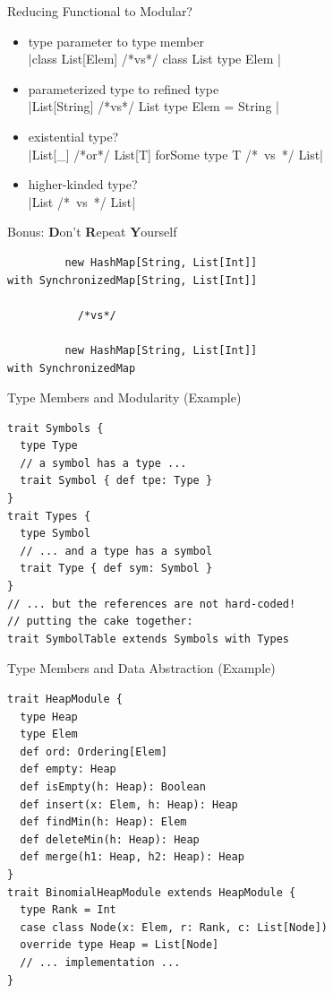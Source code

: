 \documentclass{beamer}
\begin{document}
\begin{frame}[fragile]{Reducing Functional to Modular?}
\begin{itemize}
\item type parameter to type member\\
|class List[Elem] {} /*vs*/ class List { type Elem }|
\item parameterized type to refined type\\
|List[String] /*vs*/ List { type Elem = String }|
\item existential type?\\
|List[_] /*or*/ List[T] forSome { type T } /*~vs~*/ List|
\item higher-kinded type?\\
|List /*~vs~*/ List|
\end{itemize}
\end{frame}

\begin{frame}[fragile]{Bonus: {\bf D}on't {\bf R}epeat {\bf Y}ourself}
\begin{verbatim}
         new HashMap[String, List[Int]]
with SynchronizedMap[String, List[Int]]

           /*vs*/

         new HashMap[String, List[Int]]
with SynchronizedMap
\end{verbatim}
\end{frame}

\begin{frame}[fragile]{Type Members and Modularity (Example)}
\begin{verbatim}
trait Symbols {
  type Type
  // a symbol has a type ...
  trait Symbol { def tpe: Type }
}
trait Types {
  type Symbol
  // ... and a type has a symbol
  trait Type { def sym: Symbol }
}
// ... but the references are not hard-coded!
// putting the cake together:
trait SymbolTable extends Symbols with Types
\end{verbatim}
\end{frame}

\begin{frame}[fragile]{Type Members and Data Abstraction (Example)}
\begin{verbatim}
trait HeapModule {
  type Heap
  type Elem
  def ord: Ordering[Elem]
  def empty: Heap
  def isEmpty(h: Heap): Boolean
  def insert(x: Elem, h: Heap): Heap
  def findMin(h: Heap): Elem
  def deleteMin(h: Heap): Heap
  def merge(h1: Heap, h2: Heap): Heap
}
trait BinomialHeapModule extends HeapModule {
  type Rank = Int
  case class Node(x: Elem, r: Rank, c: List[Node])
  override type Heap = List[Node]
  // ... implementation ...
}
\end{verbatim}
\end{frame}
\end{document}
